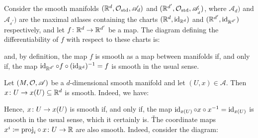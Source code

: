 \be
Consider the smooth manifolds $(\mathbb{R}^d,\mathcal{O}_\mathrm{std}, \mathscr{A}_d)$ and $(\mathbb{R}^{d'},\mathcal{O}_\mathrm{std},
\mathscr{A}_{_d'})$, where $\mathscr{A}_d)$ and $\mathscr{A}_{_d'})$ are the maximal atlases containing the charts $
(\mathbb{R}^d,\operatorname{id}_{\mathbb{R}^d})$ and $(\mathbb{R}^{d'},\operatorname{id}_{\mathbb{R}^{d'}})$ respectively, and let $f\colon \mathbb{R}^{d}\to \mathbb{R}^{d'}$ be a map. The diagram
defining the differentiability of $f$ with respect to these charts is:

\vspace{12pt}

\bse
{}
\ese

\vspace{12pt}

and, by definition, the map $f$ is smooth as a map between manifolds if, and only if, the map $\operatorname{id}_{\mathbb{R}^{d'}}\circ
f\circ (\operatorname{id}_{\mathbb{R}^d})^{-1}=f$ is smooth in the usual sense.
\ee

\be
Let $(M,\mathcal{O},\mathscr{A})$ be a $d$-dimensional smooth manifold and let $(U,x)\in\mathscr{A}$. Then $x\colon U \to x(U)
\subseteq \mathbb{R}^d$ is smooth. Indeed, we have:

\vspace{12pt}

\bse
{}
\ese

\vspace{12pt}

Hence, $x\colon U \to x(U)$ is smooth if, and only if, the map $\operatorname{id}_{x(U)}\circ x\circ x^{-1}=\operatorname{id}_{x(U)}$ is smooth in
the usual sense, which it certainly is. \v

The coordinate maps $x^i \coloneqq {\operatorname{proj}_i}\circ x\colon U \to \mathbb{R}$ are also smooth. Indeed, consider the diagram:

\vspace{12pt}

\bse
{}
\ese


